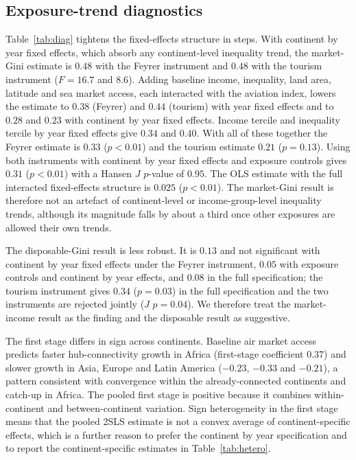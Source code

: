 \documentclass[12pt]{article}
\begin{document}
\subsection{Exposure-trend diagnostics}
Table~\ref{tab:diag} tightens the fixed-effects structure in steps. With continent by year fixed effects, which absorb any continent-level inequality trend, the market-Gini estimate is $0.48$ with the Feyrer instrument and $0.48$ with the tourism instrument ($F=16.7$ and $8.6$). Adding baseline income, inequality, land area, latitude and sea market access, each interacted with the aviation index, lowers the estimate to $0.38$ (Feyrer) and $0.44$ (tourism) with year fixed effects and to $0.28$ and $0.23$ with continent by year fixed effects. Income tercile and inequality tercile by year fixed effects give $0.34$ and $0.40$. With all of these together the Feyrer estimate is $0.33$ ($p<0.01$) and the tourism estimate $0.21$ ($p=0.13$). Using both instruments with continent by year fixed effects and exposure controls gives $0.31$ ($p<0.01$) with a Hansen $J$ $p$-value of $0.95$. The OLS estimate with the full interacted fixed-effects structure is $0.025$ ($p<0.01$). The market-Gini result is therefore not an artefact of continent-level or income-group-level inequality trends, although its magnitude falls by about a third once other exposures are allowed their own trends.

The disposable-Gini result is less robust. It is $0.13$ and not significant with continent by year fixed effects under the Feyrer instrument, $0.05$ with exposure controls and continent by year effects, and $0.08$ in the full specification; the tourism instrument gives $0.34$ ($p=0.03$) in the full specification and the two instruments are rejected jointly ($J$ $p=0.04$). We therefore treat the market-income result as the finding and the disposable result as suggestive.

The first stage differs in sign across continents. Baseline air market access predicts faster hub-connectivity growth in Africa (first-stage coefficient $0.37$) and slower growth in Asia, Europe and Latin America ($-0.23$, $-0.33$ and $-0.21$), a pattern consistent with convergence within the already-connected continents and catch-up in Africa. The pooled first stage is positive because it combines within-continent and between-continent variation. Sign heterogeneity in the first stage means that the pooled 2SLS estimate is not a convex average of continent-specific effects, which is a further reason to prefer the continent by year specification and to report the continent-specific estimates in Table~\ref{tab:hetero}.
\end{document}
